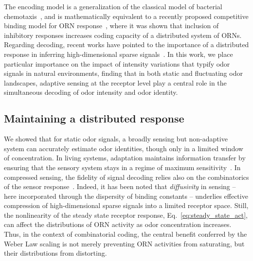 The encoding model is a generalization of the classical model of bacterial chemotaxis~\cite{tu_shimizu_berg}, and is mathematically equivalent to a recently proposed competitive binding model for ORN response~\cite{Cao_Tu_WL}, where it was shown that inclusion of inhibitory responses increases coding capacity of a distributed system of ORNs. Regarding decoding, recent works have pointed to the importance of a distributed response in inferring high-dimensional sparse signals~\cite{vijay_1, vijay_2, sharpee_zhang}. In this work, we place particular importance on the impact of intensity variations that typify odor signals in natural environments, finding that in both static and fluctuating odor landscapes, adaptive sensing at the receptor level play a central role in the simultaneous decoding of odor intensity and odor identity. 


\subsection{Maintaining a distributed response}

We showed that for static odor signals, a broadly sensing but non-adaptive system can accurately estimate odor identities, though only in a limited window of concentration. In living systems, adaptation maintains information transfer by ensuring that the sensory system stays in a regime of maximum sensitivity~\cite{information_theory_adaptation}. In compressed sensing, the fidelity of signal decoding relies also on the combinatorics of the sensor response~\cite{CS_tao, CS_donoho, CS_ganguli}. Indeed, it has been noted that \textit{diffusivity} in sensing -- here incorporated through the dispersity of binding constants -- underlies effective compression of high-dimensional sparse signals into a limited receptor space. Still, the nonlinearity of the steady state receptor response, Eq.~\ref{eq:steady_state_act}, can affect the distributions of ORN activity as odor concentration increases. Thus, in the context of combinatorial coding, the central benefit conferred by the Weber Law scaling is not merely preventing ORN activities from saturating, but their distributions from distorting. 

